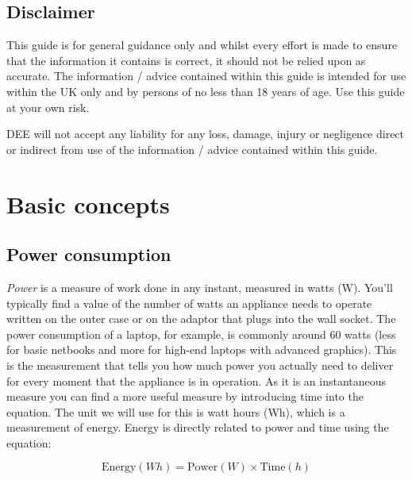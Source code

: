 \documentclass{article}
\theoremstyle{definition}
\theoremstyle{definition}
\theoremstyle{remark}
\begin{document}
  \subsection{Disclaimer} %
  \label{sub:disclaimer}

    This guide is for general guidance only and whilst every effort is made to ensure that the information it contains is correct, it should not be relied upon as accurate. The information / advice contained within this guide is intended for use within the UK only and by persons of no less than 18 years of age. Use this guide at your own risk.

    DEE will not accept any liability for any loss, damage, injury or negligence direct or indirect from use of the information / advice contained within this guide.


  \newpage  


\section{Basic concepts} %
\label{sec:basic_concepts}

  \subsection{Power consumption} %
  \label{sub:power_consumption}

    \textit{Power} is a measure of  work done in any instant, measured in watts (W). You'll typically find a value of the number of watts an appliance needs to operate written on the outer case or on the adaptor that plugs into the wall socket. The power consumption of a laptop, for example, is commonly around 60 watts (less for basic netbooks and more for high-end laptops with advanced graphics). This is the measurement that tells you how much power you actually need to deliver for every moment that the appliance is in operation. As it is an instantaneous measure you can find a more useful measure by introducing time into the equation. The unit we will use for this is watt hours (Wh), which is a measurement of energy. Energy is directly related to power and time using the equation:

    \begin{equation}
      \text{Energy} (Wh) = \text{Power} (W) \times \text{Time} (h)
    \end{equation}
\end{document}
